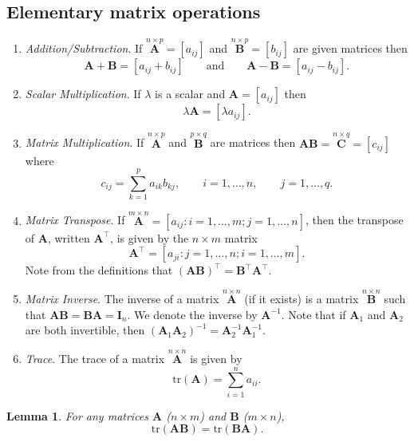 \documentclass[
]{book}
\newtheorem{lemma}{Lemma}[chapter]
\theoremstyle{definition}
\theoremstyle{definition}
\theoremstyle{definition}
\theoremstyle{definition}
\theoremstyle{remark}
\begin{document}
\subsection{Elementary matrix operations}\label{elementary-matrix-operations}

\begin{enumerate}
\def\labelenumi{\arabic{enumi}.}
\item
  \emph{Addition/Subtraction}. If \(\stackrel{n\times p}{\mathbf A}=[a_{ij}]\) and \(\stackrel{n\times p}{\mathbf B}=[b_{ij}]\) are
  given matrices then
  \[ {\mathbf A}+{\mathbf B}=[a_{ij}+b_{ij}] \qquad \text{and} \qquad {\mathbf A}-{\mathbf B}=[a_{ij}-b_{ij}].\]
\item
  \emph{Scalar Multiplication}. If \(\lambda\) is a scalar and \({\mathbf A}=[a_{ij}]\) then
  \[\lambda {\mathbf A}=[\lambda a_{ij}].\]
\item
  \emph{Matrix Multiplication}. If \(\stackrel{n\times p}{\mathbf A}\) and \(\stackrel{p\times q}{\mathbf B}\) are
  matrices then \(\mathbf A\mathbf B=\stackrel{n\times q}{\mathbf C}=[c_{ij}]\) where
  \[c_{ij}=\sum _{k=1}^p a_{ik}b_{kj}, \qquad i=1,\dots,n, \qquad j=1,\dots ,q.\]
\item
  \emph{Matrix Transpose}. If \(\stackrel{m \times n}{\mathbf A}=[a_{ij}: i=1, \ldots , m; j=1, \ldots , n]\), then the transpose of \(\mathbf A\), written
  \(\mathbf A^\top\), is given by the \(n \times m\) matrix
  \[
  \mathbf A^\top =[a_{ji}: j=1, \ldots , n; i=1, \ldots, m].
  \]
  Note from the definitions that \((\mathbf A\mathbf B)^\top={\mathbf B}^\top {\mathbf A}^\top\).
\item
  \emph{Matrix Inverse}. The inverse of a matrix \(\stackrel{n\times n}{\mathbf A}\) (if it exists) is a
  matrix \(\stackrel{n\times n}{\mathbf B}\) such that \({\mathbf A}\mathbf B=\mathbf B\mathbf A={\mathbf I}_n.\) We denote
  the inverse by \({\mathbf A}^{-1}\). Note that if \({\mathbf A}_1\) and \({\mathbf A}_2\) are both invertible,
  then \(({\mathbf A}_1 {\mathbf A}_2)^{-1}={\mathbf A}_2^{-1}{\mathbf A}_1^{-1}\).
\item
  \emph{Trace}. The trace of a matrix \(\stackrel{n\times n}{\mathbf A}\) is given by
  \[ \text{tr}({\mathbf A})=\sum _{i=1}^n a_{ii}.\]
\end{enumerate}

\begin{lemma}
\protect\hypertarget{lem:trace}{}\label{lem:trace}For any matrices \(\mathbf A\) (\(n \times m\)) and \(\mathbf B\) (\(m \times n\)),
\[
\text{tr}(\mathbf A\mathbf B) = \text{tr}(\mathbf B\mathbf A).
\]
\end{lemma}
\end{document}
